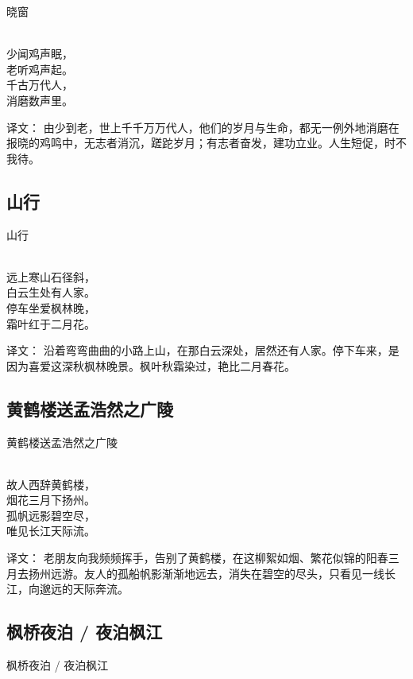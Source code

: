 \noindent 晓窗

  \\

\noindent 少闻鸡声眠，\\老听鸡声起。\\
千古万代人，\\消磨数声里。

译文：
由少到老，世上千千万万代人，他们的岁月与生命，都无一例外地消磨在报晓的鸡鸣中，无志者消沉，蹉跎岁月；有志者奋发，建功立业。人生短促，时不我待。

\subsection{山行}

\noindent 山行

  \\

\noindent 远上寒山石径斜，\\白云生处有人家。\\
停车坐爱枫林晚，\\霜叶红于二月花。

译文：
沿着弯弯曲曲的小路上山，在那白云深处，居然还有人家。停下车来，是因为喜爱这深秋枫林晚景。枫叶秋霜染过，艳比二月春花。

\subsection{黄鹤楼送孟浩然之广陵}

\noindent 黄鹤楼送孟浩然之广陵

  \\

\noindent 故人西辞黄鹤楼，\\烟花三月下扬州。\\
孤帆远影碧空尽，\\唯见长江天际流。

译文：
老朋友向我频频挥手，告别了黄鹤楼，在这柳絮如烟、繁花似锦的阳春三月去扬州远游。友人的孤船帆影渐渐地远去，消失在碧空的尽头，只看见一线长江，向邈远的天际奔流。

\subsection{枫桥夜泊 / 夜泊枫江}

\noindent 枫桥夜泊 / 夜泊枫江

  \\


